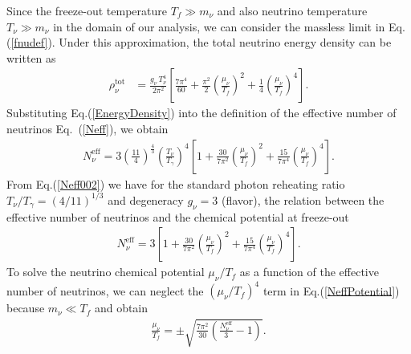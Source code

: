 Since the freeze-out temperature $T_f\gg m_\nu$ and also neutrino temperature $T_\nu\gg m_\nu$ in the domain of our analysis, we can consider the massless limit in Eq.\;(\ref{fnudef}). Under this approximation, the total neutrino energy density can be written as
\begin{align}
\label{EnergyDensity}
\rho_\nu^{\mathrm{tot}}
&=\frac{g_\nu\,T_\nu^4}{2\pi^2}\left[\frac{7\pi^4}{60}+\frac{\pi^2}{2}\left(\frac{\mu_\nu}{T_f}\right)^{\!\!2}+\frac{1}{4}\left(\frac{\mu_\nu}{T_f}\right)^{\!\!4}\right].
\end{align}
Substituting Eq.\;(\ref{EnergyDensity}) into the definition of the effective number of neutrinos Eq.~(\ref{Neff}), we obtain 
\begin{align}
\label{Neff002}
N_\nu^{\mathrm{eff}}\!\!
=\!3\!\left(\frac{11}{4}\right)^{\!\!\frac{4}{3}}\!\!\left(\frac{T_\nu}{T_\gamma}\right)^{\!\!4}\!
\left[1\!+\!\frac{30}{7\pi^2}\!\!\left(\frac{\mu_\nu}{T_f}\right)^{\!\!2} 
\!\!+\frac{15}{7\pi^4}\!\!\left(\frac{\mu_\nu}{T_f}\right)^{\!\!4}\right].
\end{align}
From Eq.\;(\ref{Neff002}) we have for the standard photon reheating ratio $T_\nu/T_\gamma=(4/11)^{1/3}$ \cite{Kolb:1990vq} and degeneracy $g_\nu=3$ (flavor), the relation between the effective number of neutrinos and the chemical potential at freeze-out
\begin{align}
\label{NeffPotential}
N_\nu^{\mathrm{eff}}=3\left[1+\frac{30}{7\pi^2}\left(\frac{\mu_\nu}{T_f}\right)^{\!\!2}+ \frac{15}{7\pi^4} \left(\frac{\mu_\nu}{T_f}\right)^{\!\!4}\right].
\end{align}
To solve the neutrino chemical potential $\mu_\nu/T_f$ as a function of the effective number of neutrinos, we can neglect the $(\mu_\nu/T_f)^4$ term in Eq.\;(\ref{NeffPotential}) because $m_\nu\ll T_f$ and obtain
\begin{align}\label{Solution}
\frac{\mu_\nu}{T_f}=\pm\sqrt{\frac{7\pi^2}{30}\left(\frac{N_\nu^{\mathrm{eff}}}{3}-1\right)}.
\end{align}

